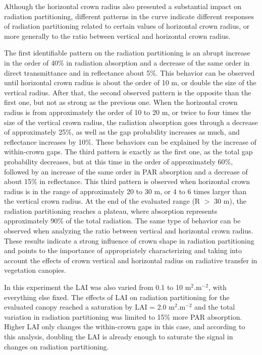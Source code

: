 Although the horizontal crown radius also presented a substantial impact on radiation partitioning, different patterns in the curve indicate different responses of radiation partitioning related to certain values of horizontal crown radius, or more generally to the ratio between vertical and horizontal crown radius. 

The first identifiable pattern on the radiation partitioning is an abrupt increase in the order of 40\% in radiation absorption and a decrease of the same order in direct transmittance and in reflectance about 5\%. This behavior can be observed until horizontal crown radius is about the order of 10 m, or double the size of the vertical radius. After that, the second observed pattern is the opposite than the first one, but not as strong as the previous one. When the horizontal crown radius is from approximately the order of 10 to 20 m, or twice to four times the size of the vertical crown radius, the radiation absorption goes through a decrease of approximately 25\%, as well as the gap probability increases as much, and reflectance increases by 10\%. These behaviors can be explained by the increase of within-crown gaps. The third pattern is exactly as the first one, as the total gap probability decreases, but at this time in the order of approximately 60\%, followed by an increase of the same order in PAR absorption and a decrease of about 15\% in reflectance. This third pattern is observed when horizontal crown radius is in the range of approximately 20 to 30 m, or 4 to 6 times larger than the vertical crown radius. At the end of the evaluated range (R $>$ 30 m), the radiation partitioning reaches a plateau, where absorption represents approximately 90\% of the total radiation. The same type of behavior can be observed when analyzing the ratio between vertical and horizontal crown radius. These results indicate a strong influence of crown shape in radiation partitioning and points to the importance of appropriately characterizing and taking into account the effects of crown vertical and horizontal radius on radiative transfer in vegetation canopies.
   
In this experiment the LAI was also varied from 0.1 to 10 m$^2$.m$^{-2}$, with everything else fixed. The effects of LAI on radiation partitioning for the evaluated canopy reached a saturation by LAI = 2.0 m$^2$.m$^{-2}$ and the total variation in radiation partitioning was limited to 15\% more PAR absorption. Higher LAI only changes the within-crown gaps in this case, and according to this analysis, doubling the LAI is already enough to saturate the signal in changes on radiation partitioning. 

